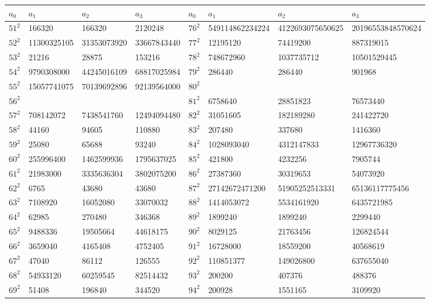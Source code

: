 \documentclass[10pt]{amsart}
\theoremstyle{plain}
\begin{document}
\begin{landscape}
\begin{table}[htbp]
\centering
\begin{tabular}{|l|l|l|l||l|l|l|l|}
\hline
$a_{0}$ & $a_{1}$ & $a_{2}$ & $a_{3}$ &
$a_{0}$ & $a_{1}$ & $a_{2}$ & $a_{3}$ \\
\hline
$51^2$ & 166320 & 166320 & 2120248 & $76^2$ & 549114862234224 & 4122693075650625 & 20196553848570624 \\
$52^2$ & 11300325105 & 31353073920 & 33667843440 & $77^2$ & 12195120 & 74419200 & 887319015 \\
$53^2$ & 21216 & 28875 & 153216 & $78^2$ & 748672960 & 1037735712 & 10501529445 \\
$54^2$ & 9790308000 & 44245016109 & 68817025984 & $79^2$ & 286440 & 286440 & 901968 \\
$55^2$ & 15057741075 & 70139692896 & 92139564000 & $80^2$ &   &   &   \\
$56^2$ &   &   &   & $81^2$ & 6758640 & 28851823 & 76573440 \\
$57^2$ & 708142072 & 7438541760 & 12494094480 & $82^2$ & 31051605 & 182189280 & 241422720 \\
$58^2$ & 44160 & 94605 & 110880 & $83^2$ & 207480 & 337680 & 1416360 \\
$59^2$ & 25080 & 65688 & 93240 & $84^2$ & 1028093040 & 4312147833 & 12967736320 \\
$60^2$ & 255996400 & 1462599936 & 1795637025 & $85^2$ & 421800 & 4232256 & 7905744 \\
$61^2$ & 21983000 & 3335636304 & 3802075200 & $86^2$ & 27387360 & 30319653 & 54073920 \\
$62^2$ & 6765 & 43680 & 43680 & $87^2$ & 27142672471200 & 51905252513331 & 65136117775456 \\
$63^2$ & 7108920 & 16052080 & 33070032 & $88^2$ & 1414053072 & 5534161920 & 6435721985 \\
$64^2$ & 62985 & 270480 & 346368 & $89^2$ & 1899240 & 1899240 & 2299440 \\
$65^2$ & 9488336 & 19505664 & 44618175 & $90^2$ & 8029125 & 21763456 & 126824544 \\
$66^2$ & 3659040 & 4165408 & 4752405 & $91^2$ & 16728000 & 18559200 & 40568619 \\
$67^2$ & 47040 & 86112 & 126555 & $92^2$ & 110851377 & 149026800 & 637655040 \\
$68^2$ & 54933120 & 60259545 & 82514432 & $93^2$ & 200200 & 407376 & 488376 \\
$69^2$ & 51408 & 196840 & 344520 & $94^2$ & 200928 & 1551165 & 3109920 \\

\end{tabular}
\end{table}
\end{landscape}
\end{document}
